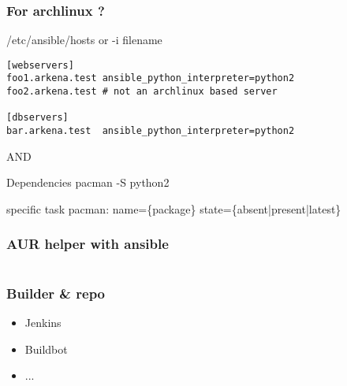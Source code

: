 \documentclass{beamer}
\begin{document}
\begin{frame}[fragile]
\frametitle{For archlinux ?}

    \begin{block}{/etc/ansible/hosts or -i filename}
        \begin{verbatim}
[webservers]
foo1.arkena.test ansible_python_interpreter=python2
foo2.arkena.test # not an archlinux based server

[dbservers]
bar.arkena.test  ansible_python_interpreter=python2
        \end{verbatim}
    \end{block}
AND
    \begin{block}{Dependencies}
pacman -S python2
    \end{block}
\end{frame}

\begin{frame}[fragile]

    \begin{block}{specific task}
    pacman: name=\{package\} state=\{absent|present|latest\}
    \end{block}


\end{frame}

\begin{frame}
\frametitle{AUR helper with ansible}
    \begin{block}{}
        \tiny{
        \inputminted{yaml}{sources/aur_helper/tasks/main.yml}
        }
    \end{block}
\end{frame}

\begin{frame}
\frametitle{Builder \& repo}
    \begin{itemize}
        \item Jenkins
        \item Buildbot
        \item ...
    \end{itemize}
\end{frame}

\begin{frame}
\end{frame}
\end{document}
